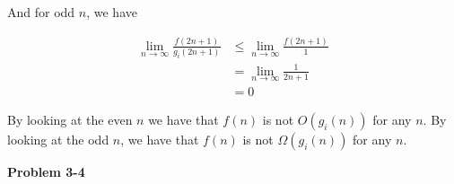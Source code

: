 \documentclass{article}
\begin{document}
\begin{enumerate}[a.]
And for odd $n$, we have

\begin{align*}
\lim_{n\rightarrow\infty} \frac{f(2n+1)}{g_i(2n+1)} &\le \lim_{n\rightarrow\infty} \frac{f(2n+1)}{1}\\
&= \lim_{n\rightarrow\infty}\frac{1}{2n+1}\\
&=0
\end{align*}

By looking at the even $n$ we have that $f(n)$ is not $O(g_i(n))$ for any $n$. By looking at the odd $n$, we have that $f(n)$ is not $\Omega(g_i(n))$ for any $n$.





\end{enumerate}

\noindent\textbf{Problem 3-4}\\
\end{document}
